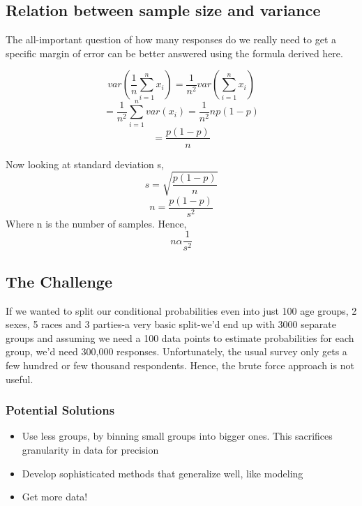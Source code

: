 \subsection{Relation between sample size and variance}
The all-important question of how many responses do we really need to get a specific margin of error can be better answered using the formula derived here.

\begin{equation}
  var( \frac{1}{n} \sum_{i=1}^{n}  x_i) = \frac{1}{n^2}var( \sum_{i=1}^{n}  x_i) 
\end{equation}
\begin{equation}
    = \frac{1}{n^2} \sum_{i=1}^{n} var(x_i) = \frac{1}{n^2}np(1-p)
\end{equation}
\begin{equation}
    = \frac{p(1-p)}{n}
\end{equation}

Now looking at standard deviation s,
 \begin{equation}
    s = \sqrt{\frac{p(1-p)}{n}}
\end{equation}
 \begin{equation}
    n = \frac{p(1-p)}{s^2}
\end{equation}
Where n is the number of samples. Hence,
\begin{equation}
    n \alpha \frac{1}{s^2}
\end{equation}



\subsection{The Challenge}
If we wanted to split our conditional probabilities even into just 100 age groups, 2 sexes, 5 races and 3 parties-a very basic split-we'd end up with 3000 separate groups and assuming we need a 100 data points to estimate probabilities for each group, we'd need 300,000 responses. Unfortunately, the usual survey only gets a few hundred or few thousand respondents. 
Hence, the brute force approach is not useful.

\subsubsection{Potential Solutions}
\begin{itemize}
  \item Use less groups, by binning small groups into bigger ones. This sacrifices granularity in data for precision
  \item Develop sophisticated methods that generalize well, like modeling
  \item Get more data!
\end{itemize}

